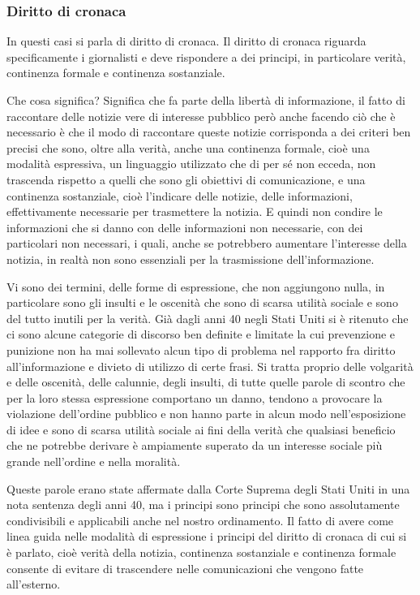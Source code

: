 \subsubsection{Diritto di cronaca}
In questi casi si parla di diritto di cronaca. Il diritto di cronaca riguarda specificamente i giornalisti e deve rispondere a dei principi, in particolare verità, continenza formale e continenza sostanziale.

Che cosa significa? Significa che fa parte della libertà di informazione, il fatto di raccontare delle notizie vere di interesse pubblico però anche facendo ciò che è necessario è che il modo di raccontare queste notizie corrisponda a dei criteri ben precisi che sono, oltre alla verità, anche una continenza formale, cioè una modalità espressiva, un linguaggio utilizzato che di per sé non ecceda, non trascenda rispetto a quelli che sono gli obiettivi di comunicazione, e una continenza sostanziale, cioè l'indicare delle notizie, delle informazioni, effettivamente necessarie per trasmettere la notizia. E quindi non condire le informazioni che si danno con delle informazioni non necessarie, con dei particolari non necessari, i quali, anche se potrebbero aumentare l'interesse della notizia, in realtà non sono essenziali per la trasmissione dell'informazione.

Vi sono dei termini, delle forme di espressione, che non aggiungono nulla, in particolare sono gli insulti e le oscenità che sono di scarsa utilità sociale e sono del tutto inutili per la verità. Già dagli anni 40 negli Stati Uniti si è ritenuto che ci sono alcune categorie di discorso ben definite e limitate la cui prevenzione e punizione non ha mai sollevato alcun tipo di problema nel rapporto fra diritto all'informazione e divieto di utilizzo di certe frasi. Si tratta proprio delle volgarità e delle oscenità, delle calunnie, degli insulti, di tutte quelle parole di scontro che per la loro stessa espressione comportano un danno, tendono a provocare la violazione dell'ordine pubblico e non hanno parte in alcun modo nell'esposizione di idee e sono di scarsa utilità sociale ai fini della verità che qualsiasi beneficio che ne potrebbe derivare è ampiamente superato da un interesse sociale più grande nell'ordine e nella moralità.

Queste parole erano state affermate dalla Corte Suprema degli Stati Uniti in una nota sentenza degli anni 40, ma i principi sono principi che sono assolutamente condivisibili e applicabili anche nel nostro ordinamento. Il fatto di avere come linea guida nelle modalità di espressione i principi del diritto di cronaca di cui si è parlato, cioè verità della notizia, continenza sostanziale e continenza formale consente di evitare di trascendere nelle comunicazioni che vengono fatte all'esterno.

